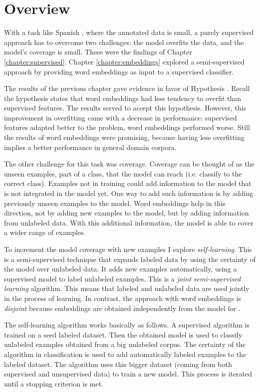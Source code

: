 \section{Overview}

With a task like Spanish \vsd, where the annotated data is small, a purely
supervised approach has to overcome two challenges: the model overfits the
data, and the model's coverage is small. These were the findings of Chapter
\ref{chapter:supervised}. Chapter \ref{chapter:embeddings} explored a
semi-supervised approach by providing word embeddings as input to a supervised
classifier.

The results of the previous chapter gave evidence in favor of Hypothesis
\label{hyp:embeddings:3}. Recall the hypothesis states that word embeddings had
less tendency to overfit than supervised features. The results served to accept
this hypothesis. However, this improvement in overfitting came with a decrease
in performance: supervised features adapted better to the problem, word
embeddings performed worse. Still the results of word embeddings were
promising, because having less overfitting implies a better performance in
general domain corpora.

The other challenge for this task was coverage. Coverage can be thought of as
the unseen examples, part of a class, that the model can reach (i.e. classify
to the correct class). Examples not in training could add information to the
model that is not integrated in the model yet. One way to add such information
is by adding previously unseen examples to the model. Word embeddings help in
this direction, not by adding new examples to the model, but by adding
information from unlabeled data. With this additional information, the model is
able to cover a wider range of examples.

To increment the model coverage with new examples I explore {\em
self-learning}. This is a semi-supervised technique that expands labeled data
by using the certainty of the model over unlabeled data. It adds new examples
automatically, using a supervised model to label unlabeled examples.  This is a
{\em joint semi-supervised learning} algorithm. This means that labeled and
unlabeled data are used jointly in the process of learning. In contrast, the
approach with word embeddings is {\em disjoint} because embeddings are obtained
independently from the model for \vsd.

The self-learning algorithm works basically as follows. A supervised algorithm
is trained on a seed labeled dataset. Then the obtained model is used to
classify unlabeled examples obtained from a big unlabeled corpus. The certainty
of the algorithm in classification is used to add automatically labeled
examples to the labeled dataset. The algorithm uses this bigger dataset (coming
from both supervised and unsupervised data) to train a new model. This process
is iterated until a stopping criterion is met.

